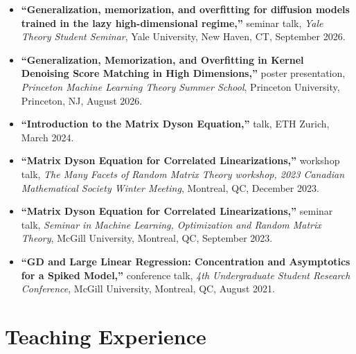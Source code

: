 \documentclass[12pt]{moderncv}
\begin{document}
\begin{itemize}
    \item \textbf{``Generalization, memorization, and overfitting for diffusion models trained in the lazy high-dimensional regime,''} seminar talk, \textit{Yale Theory Student Seminar}, Yale University, New Haven, CT, September 2026.

    \vspace{0.4em}
    \item \textbf{``Generalization, Memorization, and Overfitting in Kernel Denoising Score Matching in High Dimensions,''} poster presentation, \textit{Princeton Machine Learning Theory Summer School}, Princeton University, Princeton, NJ, August 2026.

    \vspace{0.4em}
    \item \textbf{``Introduction to the Matrix Dyson Equation,''} talk, ETH Zurich, March 2024.

    \vspace{0.4em}
    \item \textbf{``Matrix Dyson Equation for Correlated Linearizations,''} workshop talk, \textit{The Many Facets of Random Matrix Theory workshop, 2023 Canadian Mathematical Society Winter Meeting}, Montreal, QC, December 2023.

    \vspace{0.4em}
    \item \textbf{``Matrix Dyson Equation for Correlated Linearizations,''} seminar talk, \textit{Seminar in Machine Learning, Optimization and Random Matrix Theory}, McGill University, Montreal, QC, September 2023.

    \vspace{0.4em}
    \item \textbf{``GD and Large Linear Regression: Concentration and Asymptotics for a Spiked Model,''} conference talk, \textit{4th Undergraduate Student Research Conference}, McGill University, Montreal, QC, August 2021.
\end{itemize}

\section{Teaching Experience}
\end{document}
